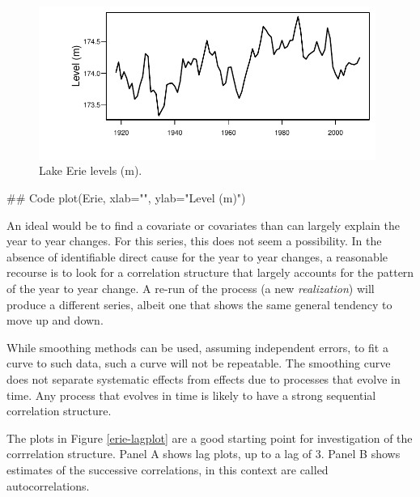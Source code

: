 \documentclass{tufte-book}\usepackage[]{graphicx}\usepackage[]{color}
\begin{document}
\begin{figure}
\begin{Schunk}


\centerline{\includegraphics[width=0.98\textwidth]{figs/12-Erie1-1} }

\end{Schunk}
\caption{Lake Erie levels (m).
}\label{fig:erie}
\end{figure}
\begin{marginfigure}[-7cm]
\begin{Schunk}
\begin{Sinput}
## Code
plot(Erie, xlab="",
     ylab="Level (m)")
\end{Sinput}
\end{Schunk}
\end{marginfigure}

An ideal would be to find a covariate or covariates than can largely
explain the year to year changes.  For this series, this does not seem
a possibility.  In the absence of identifiable direct cause for the
year to year changes, a reasonable recourse is to look for a
correlation structure that largely accounts for the pattern of the
year to year change.  A re-run of the process (a new {\em
  realization}) will produce a different series, albeit one that shows
the same general tendency to move up and down.

While smoothing methods can be used, assuming independent errors, to
fit a curve to such data, such a curve will not be repeatable.  The
smoothing curve does not separate systematic effects from effects due
to processes that evolve in time.  Any process that evolves in time is
likely to have a strong sequential correlation structure.

The plots in Figure \ref{erie-lagplot} are a good starting point for
investigation of the corrrelation structure.  Panel A shows lag plots,
up to a lag of 3.  Panel B shows estimates of the successive
correlations, in this context are called autocorrelations.
\vspace*{-12pt}
\end{document}
